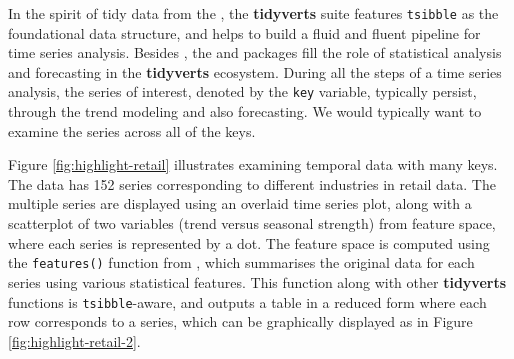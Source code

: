 In the spirit of tidy data from the 
\citep{Wickham2019}, the \textbf{tidyverts} suite features
\texttt{tsibble} as the foundational data structure, and helps to build
a fluid and fluent pipeline for time series analysis. Besides
, the  \citep{R-feasts} and
 \citep{R-fable} packages fill the role of statistical
analysis and forecasting in the \textbf{tidyverts} ecosystem. During all
the steps of a time series analysis, the series of interest, denoted by
the \texttt{key} variable, typically persist, through the trend modeling
and also forecasting. We would typically want to examine the series
across all of the keys.

Figure \ref{fig:highlight-retail} illustrates examining temporal data
with many keys. The data has 152 series corresponding to different
industries in retail data. The multiple series are displayed using an
overlaid time series plot, along with a scatterplot of two variables
(trend versus seasonal strength) from feature space, where each series
is represented by a dot. The feature space is computed using the
\texttt{features()} function from , which summarises the
original data for each series using various statistical features. This
function along with other \textbf{tidyverts} functions is
\texttt{tsibble}-aware, and outputs a table in a reduced form where each
row corresponds to a series, which can be graphically displayed as in
Figure \ref{fig:highlight-retail-2}.

